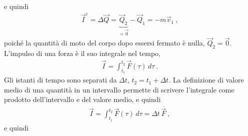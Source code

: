 \documentclass[letterpaper,10pt,italian]{jupyterBook}
\begin{document}
\sphinxAtStartPar
e quindi
\begin{equation*}
\begin{split}\vec{I}^e = \Delta \vec{Q} = \underbrace{\vec{Q}_2}_{= \vec{0}} - \vec{Q}_1 = - m \vec{v}_1 \ ,\end{split}
\end{equation*}
\sphinxAtStartPar
poiché la quantità di moto del corpo dopo essersi fermato è nulla, \(\vec{Q}_2 = \vec{0}\). L’impulso di una forza è il suo integrale nel tempo,
\begin{equation*}
\begin{split}\vec{I} = \int_{t_1}^{t_2} \vec{F}(\tau) \, d \tau \ .\end{split}
\end{equation*}
\sphinxAtStartPar
Gli istanti di tempo sono separati da \(\Delta t\), \(t_2 = t_1 + \Delta t\). La definizione di valore medio di una quantità in un intervallo permette di scrivere l’integrale come prodotto dell’intervallo e del valore medio, e quindi
\begin{equation*}
\begin{split}\vec{I} = \int_{t_1}^{t_2} \vec{F}(\tau) \, d \tau = \Delta t \, \overline{\vec{F}} \ ,\end{split}
\end{equation*}
\sphinxAtStartPar
e quindi
\end{document}
